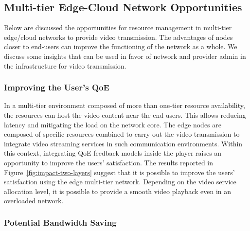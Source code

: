 \subsection{Multi-tier Edge-Cloud Network Opportunities}

Below are discussed the opportunities for resource management in multi-tier edge/cloud networks to provide video transmission. The advantages of nodes closer to end-users can improve the functioning of the network as a whole. We discuss some insights that can be used in favor of network and provider admin in the infrastructure for video transmission.

\subsubsection{Improving the User's QoE}

In a multi-tier environment composed of more than one-tier resource availability, the resources can host the video content near the end-users. This allows reducing latency and mitigating the load on the network core. The edge nodes are composed of specific resources combined to carry out the video transmission to integrate video streaming services in such communication environments. Within this context, integrating QoE feedback models inside the player raises an opportunity to improve the users' satisfaction. %
The results reported in Figure~\ref{fig:impact-two-layers} suggest that it is possible to improve the users' satisfaction using the edge multi-tier network. Depending on the video service allocation level, it is possible to provide a smooth video playback even in an overloaded network. %

\subsubsection{Potential Bandwidth Saving}


